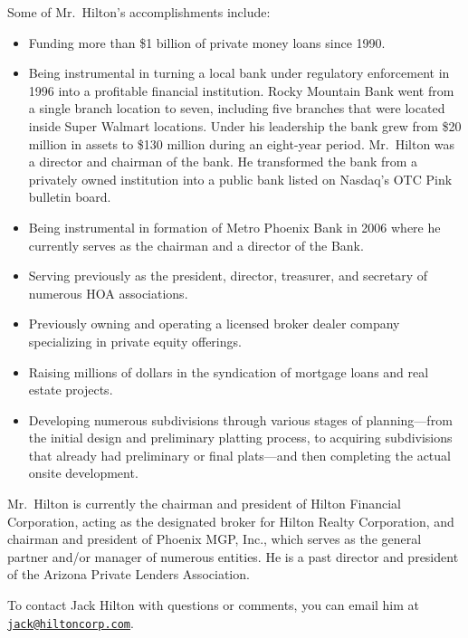 \documentclass[
]{book}
\providecommand{\tightlist}{%
  \setlength{\itemsep}{0pt}\setlength{\parskip}{0pt}}
\begin{document}
Some of Mr.~Hilton's accomplishments include:

\begin{itemize}
\tightlist
\item
  Funding more than \$1 billion of private money loans since 1990.
\item
  Being instrumental in turning a local bank under regulatory enforcement in 1996 into a profitable financial institution. Rocky Mountain Bank went from a single branch location to seven, including five branches that were located inside Super Walmart locations. Under his leadership the bank grew from \$20 million in assets to \$130 million during an eight-year period. Mr.~Hilton was a director and chairman of the bank. He transformed the bank from a privately owned institution into a public bank listed on Nasdaq's OTC Pink bulletin board.
\item
  Being instrumental in formation of Metro Phoenix Bank in 2006 where he currently serves as the chairman and a director of the Bank.
\item
  Serving previously as the president, director, treasurer, and secretary of numerous HOA associations.
\item
  Previously owning and operating a licensed broker dealer company specializing in private equity offerings.
\item
  Raising millions of dollars in the syndication of mortgage loans and real estate projects.
\item
  Developing numerous subdivisions through various stages of planning---from the initial design and preliminary platting process, to acquiring subdivisions that already had preliminary or final plats---and then completing the actual onsite development.
\end{itemize}

Mr.~Hilton is currently the chairman and president of Hilton Financial Corporation,
acting as the designated broker for Hilton Realty Corporation, and chairman and president of Phoenix MGP, Inc.,
which serves as the general partner and/or manager of numerous entities.
He is a past director and president of the Arizona Private Lenders Association.

To contact Jack Hilton with questions or comments, you can email him at \href{mailto:jack@hiltoncorp.com}{\nolinkurl{jack@hiltoncorp.com}}.
\end{document}

